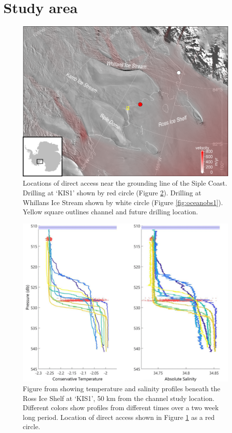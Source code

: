 \section{Study area} \label{sec:conditions}

\begin{figure}[!ht]
\centering
    \includegraphics[width=1\textwidth]{chapters/4/drilling_locations_small.png}
    \caption[]{Locations of direct access near the grounding line of the Siple Coast. Drilling at `KIS1' shown by red circle (Figure \ref{fig:oceanobs2}). Drilling at Whillans Ice Stream shown by white circle (Figure \ref{fig:oceanobs1}). Yellow square outlines channel and future drilling location.}
    \label{fig:map_drill}
\end{figure}

\begin{figure}[!ht]
\centering
    \includegraphics[width=1\textwidth]{chapters/4/oceanobs2.jpg}
    \caption[]{Figure from \cite{robinson2020ice} showing temperature and salinity profiles beneath the Ross Ice Shelf at `KIS1', 50 km from the channel study location. Different colors show profiles from different times over a two week long period. Location of direct access shown in Figure \ref{fig:map_drill} as a red circle.}
    \label{fig:oceanobs2}
\end{figure}

